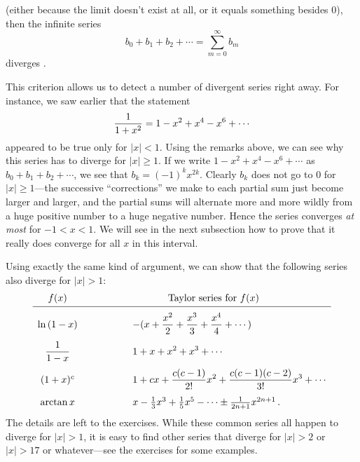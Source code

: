 {{{{\begin{center}
{{   \medskip
   (either because the limit doesn't exist at all, or it equals something besides 0),\\
   
   then the infinite series 
   \[
b_0 + b_1 + b_2 + \cdots= \sum_{m=0}^\infty b_m
\]
    diverges .
    \vspace{4pt}}
}
\end{center}

This criterion allows us to detect a number of divergent series 
right away.  For instance, we saw earlier that the statement
\[
{\displaystyle {1 \over {1+x^2}} }= {\displaystyle 1-x^2+x^4-x^6+\cdots}
\]
appeared to be true only for $|x|<1$. Using the remarks above, we can see why this series has to diverge for $|x|\ge 1$.  If we write $1-x^2+x^4-x^6+\cdots$ as $b_0 + b_1 + b_2 + \cdots$, we see that $b_k=(-1)^kx^{2k}$.  Clearly $b_k$ does not go to 0 for $|x|\ge 1$---the successive ``corrections'' we make to each partial sum just become larger and larger, and the partial sums will alternate more and more wildly from a huge positive number to a huge negative number.  Hence the series converges {\em at most} for $-1<x<1$.  We will see in the next subsection how to prove that it really does converge for all  $x$ in this interval.

Using exactly the same kind of argument, we can show that the following series also diverge for $|x|>1$:
\[
\begin{array}{ccl}
        f(x) &\hspace{.5in} & \hspace{.5in}\mbox{Taylor series for $f(x)$} \\ [2pt] \hline
        & & \\ [-6pt] 
        \ln{(1-x)}& &{\displaystyle  -(x+{x^2 \over 2} + {x^3 \over 3} 
                + {x^4 \over 4} + \cdots)}\\ [.15in]
        {\displaystyle {1 \over {1-x}} }& &{\displaystyle 1+x+x^2+x^3+\cdots } \\ [.15in]
        (1+x)^c & &{\displaystyle 1 +cx+{c(c-1) \over 2!}x^2+{c(c-1)(c-2) \over 3!}x^3 + \cdots} \\ [.15in]
        \arctan{x} & &x-{1 \over 3}x^3 + {1 \over 5} x^5 - \cdots \pm {1 \over {2n+1}}x^{2n+1} \, .

        \end{array}
\]
The details are left to the exercises.  While these common series all happen to diverge for $|x|>1$, it is easy to find other series that diverge for $|x|>2$ or $|x|>17$ or whatever---see the exercises for some examples.

}}}}
